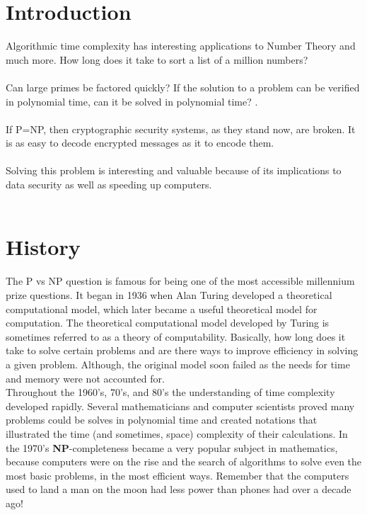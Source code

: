 \documentclass[14pt]{article}
\begin{document}
\LARGE
\section*{Introduction}
Algorithmic time complexity has interesting applications to Number Theory and much more.  How long does it take to sort a list of a million numbers?  
\\
\\
Can  large primes be factored quickly?  If the solution to a problem can be verified in polynomial time, can it be solved in polynomial time?  \cite{CD}.
\\
\\
If P=NP, then cryptographic security systems, as they stand now, are broken.  It is as easy to decode encrypted messages as it to encode them.
\\
\\
Solving this problem is interesting and valuable because of its implications to data security as well as speeding up computers.
\\
\\

\newpage
\section*{History}
\hspace*{.25 cm} The P vs NP question is famous for being one of the most accessible millennium prize questions\cite{Sipser}. It began in 1936 when Alan Turing developed a theoretical computational model, which later became a useful theoretical model for computation. The theoretical computational model developed by Turing is sometimes referred to as a theory of computability. Basically, how long does it take to solve certain problems and are there ways to improve efficiency in solving a given problem. Although, the original model soon failed as the needs for time and memory were not accounted for\cite{Fortnow}.
\\
\vspace*{.25 cm}
\hspace*{.25 cm} Throughout the 1960's, 70's, and 80's the understanding of time complexity developed rapidly. Several mathematicians and computer scientists proved many problems could be solves in polynomial time and created notations that illustrated the time (and sometimes, space) complexity of their calculations. In the 1970's \textbf{NP}-completeness became a very popular subject in mathematics, because computers were on the rise and the search of algorithms to solve even the most basic problems, in the most efficient ways\cite{Fortnow}. Remember that the computers used to land a man on the moon had less power than phones had over a decade ago!\\
\end{document}
